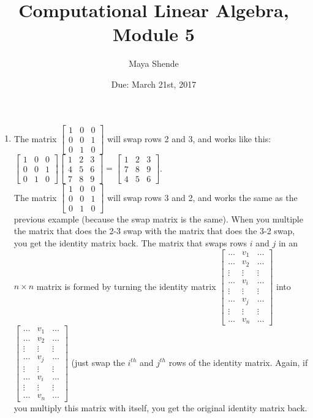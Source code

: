 \documentclass{article}
\title{Computational Linear Algebra, Module 5}
\author{Maya Shende}
\date{Due: March 21st, 2017}
\begin{document}
\maketitle

\begin{enumerate}
	\item The matrix $
	\begin{bmatrix}
		1	&0	&0\\
		0	&0	&1\\
		0	&1	&0
	\end{bmatrix}
	$ will swap rows 2 and 3, and works like this: $
	\begin{bmatrix}
		1	&0	&0\\
		0	&0	&1\\
		0	&1	&0
	\end{bmatrix}
	\begin{bmatrix}
		1	&2	&3\\
		4	&5	&6\\
		7	&8	&9
	\end{bmatrix}
	= 
	\begin{bmatrix}
		1	&2	&3\\
		7	&8	&9\\
		4	&5	&6
	\end{bmatrix}	
	$. \\
	The matrix $
	\begin{bmatrix}
		1	&0	&0\\
		0	&0	&1\\
		0	&1	&0
	\end{bmatrix}
	$ will swap rows 3 and 2, and works the same as the previous example (because the swap matrix is the same). 
	When you multiple the matrix that does the 2-3 swap with the matrix that does the 3-2 swap, you get the identity matrix back. The matrix that swaps rows $i$ and $j$ in an $n \times n$ matrix is formed by turning the identity matrix $
	\begin{bmatrix}
		\dots		&v_1		&\dots\\
		\dots 	&v_2		&\dots\\
		\vdots	&\vdots	&\vdots\\
		\dots		&v_i		&\dots\\
		\vdots	&\vdots	&\vdots\\
		\dots		&v_j		&\dots\\
		\vdots	&\vdots	&\vdots\\
		\dots		&v_n		&\dots
	\end{bmatrix}
	$ into $
	\begin{bmatrix}
		\dots		&v_1		&\dots\\
		\dots 	&v_2		&\dots\\
		\vdots	&\vdots	&\vdots\\
		\dots		&v_j		&\dots\\
		\vdots	&\vdots	&\vdots\\
		\dots		&v_i		&\dots\\
		\vdots	&\vdots	&\vdots\\
		\dots		&v_n		&\dots
	\end{bmatrix}
	$ (just swap the $i^{th}$ and $j^{th}$ rows of the identity matrix. Again, if you multiply this matrix with itself, you get the original identity matrix back.
	

\end{enumerate}
\end{document}
